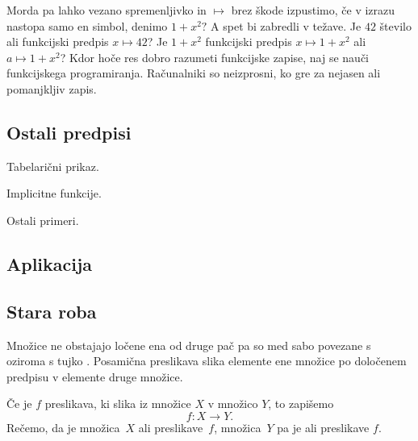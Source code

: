 Morda pa lahko vezano spremenljivko in $\mapsto$ brez škode izpustimo, če v izrazu nastopa
samo en simbol, denimo $1 + x^2?$
%
A spet bi zabredli v težave. Je $42$ število ali funkcijski predpis $x \mapsto 42$? Je
$1 + x^2$ funkcijski predpis $x \mapsto 1 + x^2$ ali $a \mapsto 1 + x^2$? Kdor hoče res
dobro razumeti funkcijske zapise, naj se nauči funkcijskega programiranja. Računalniki so
neizprosni, ko gre za nejasen ali pomanjkljiv zapis.

\subsection{Ostali predpisi}
\label{sec:ostali-predpisi}


Tabelarični prikaz.

Implicitne funkcije.

Ostali primeri.

\subsection{Aplikacija}
\label{sec:aplikacija}





\subsection{Stara roba}
\label{sec:stara-roba}



Množice ne obstajajo ločene ena od druge pač pa so med sabo povezane s
 oziroma s tujko .  Posamična preslikava slika elemente ene
množice po določenem predpisu v elemente druge množice.

Če je $f$ preslikava, ki slika iz množice $X$ v množico $Y$, to zapišemo
%
\begin{equation*}
  f : X \to Y.
\end{equation*}
%
Rečemo, da je množica~$X$  ali  preslikave~$f$, množica~$Y$
pa je  ali  preslikave $f$.


